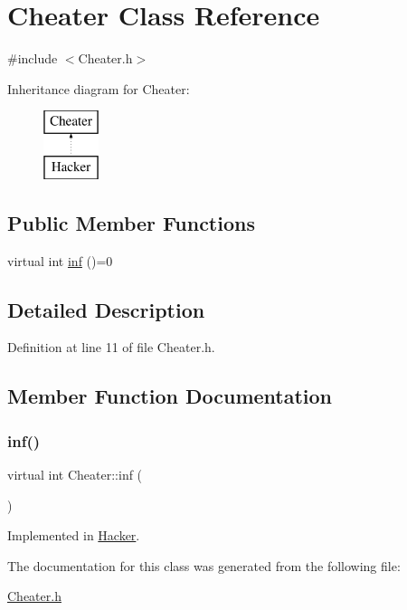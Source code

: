 \hypertarget{class_cheater}{}\section{Cheater Class Reference}
\label{class_cheater}


{\ttfamily \#include $<$Cheater.\+h$>$}

Inheritance diagram for Cheater\+:\begin{figure}[H]
\begin{center}
\leavevmode
\includegraphics[height=2.000000cm]{class_cheater}
\end{center}
\end{figure}
\subsection*{Public Member Functions}
\begin{DoxyCompactItemize}
\item 
virtual int \hyperlink{class_cheater_af7f2736e09639dc3c6f7e371486bae8d}{inf} ()=0
\end{DoxyCompactItemize}


\subsection{Detailed Description}


Definition at line 11 of file Cheater.\+h.



\subsection{Member Function Documentation}
\hypertarget{class_cheater_af7f2736e09639dc3c6f7e371486bae8d}{}\label{class_cheater_af7f2736e09639dc3c6f7e371486bae8d} 
\subsubsection{\texorpdfstring{inf()}{inf()}}
{\footnotesize\ttfamily virtual int Cheater\+::inf (\begin{DoxyParamCaption}{ }\end{DoxyParamCaption})\hspace{0.3cm}{\ttfamily [pure virtual]}}



Implemented in \hyperlink{class_hacker_ad55877a5c4ad1020fee175d1809093e4}{Hacker}.



The documentation for this class was generated from the following file\+:\begin{DoxyCompactItemize}
\item 
\hyperlink{_cheater_8h}{Cheater.\+h}\end{DoxyCompactItemize}
